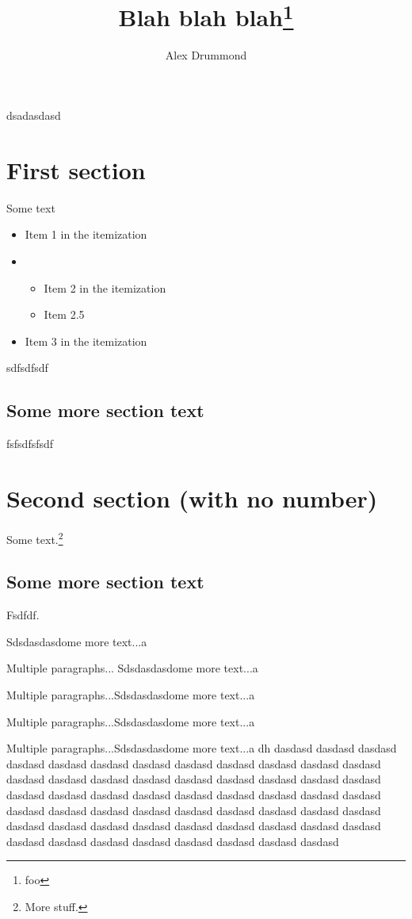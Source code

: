 \documentclass[doublespace,endnotes]{lingpaper}
\author{Alex Drummond}
\title{Blah blah blah\thanks{foo}}
\begin{document}
\maketitle

\noindent
dsadasdasd

\section{First section}
Some text

\begin{itemize}
\setlength\topsep{50pt}%
\setlength\partopsep{50pt}%
\setlength\itemsep{0pt}
\item
Item 1 in the itemization
\item
\begin{itemize}
\item
Item 2 in the itemization
\item
Item 2.5
\end{itemize}
\item
Item 3 in the itemization
\end{itemize}

sdfsdfsdf

\subsection{Some more section text}
fsfsdfsfsdf

\section*{Second section (with no number)}
Some text.\footnote{More stuff.}

\subsection{Some more section text}
Fsdfdf.

Sdsdasdasdome more text...a

Multiple paragraphs...
Sdsdasdasdome more text...a

Multiple paragraphs...Sdsdasdasdome more text...a

Multiple paragraphs...Sdsdasdasdome more text...a

Multiple paragraphs...Sdsdasdasdome more text...a dh dasdasd dasdasd dasdasd dasdasd dasdasd dasdasd dasdasd dasdasd dasdasd dasdasd dasdasd dasdasd dasdasd dasdasd dasdasd dasdasd dasdasd dasdasd dasdasd dasdasd dasdasd dasdasd dasdasd dasdasd dasdasd dasdasd dasdasd dasdasd dasdasd dasdasd dasdasd dasdasd dasdasd dasdasd dasdasd dasdasd dasdasd dasdasd dasdasd dasdasd dasdasd dasdasd dasdasd dasdasd dasdasd dasdasd dasdasd dasdasd dasdasd dasdasd dasdasd dasdasd dasdasd dasdasd dasdasd dasdasd 
\end{document}
